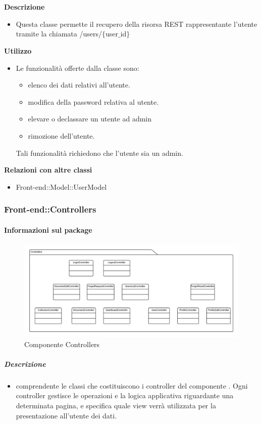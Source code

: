				\textbf{\\ \\ Descrizione} 
					\begin{itemize}
						\item[] Questa classe permette il recupero della risorsa REST rappresentante l'utente tramite la chiamata /users/$\{$user$\_$id$\}$
					\end{itemize}      
				\textbf{Utilizzo}  
					\begin{itemize}
						\item[] Le funzionalità offerte dalla classe sono: 
\begin{itemize} 
\item elenco dei dati relativi all'utente. 
\item modifica della password relativa al utente.
\item elevare o declassare un utente ad admin 
\item rimozione dell'utente.
\end{itemize}
Tali funzionalità richiedono che l'utente sia un admin.
					\end{itemize}
					\textbf{Relazioni con altre classi}
					\begin{itemize}
							\item{Front-end::Model::UserModel}
					\end{itemize}
	\subsubsection{Front-end::Controllers}
	\paragraph{Informazioni sul package} 
		\begin{figure}[H] 
			\begin{center} 
				\includegraphics[width=\textwidth]{uml/package/Front-end::Controllers.png}  
				\caption{Componente Controllers}
			\end{center}  
		\end{figure} 
	\subparagraph{Descrizione} 
		\begin{itemize}
		\item[]  comprendente le classi che costituiscono i controller del componente . Ogni controller gestisce le operazioni e la logica applicativa riguardante una determinata pagina, e specifica quale view verrà utilizzata per la presentazione all'utente dei dati.
		\end{itemize} 
